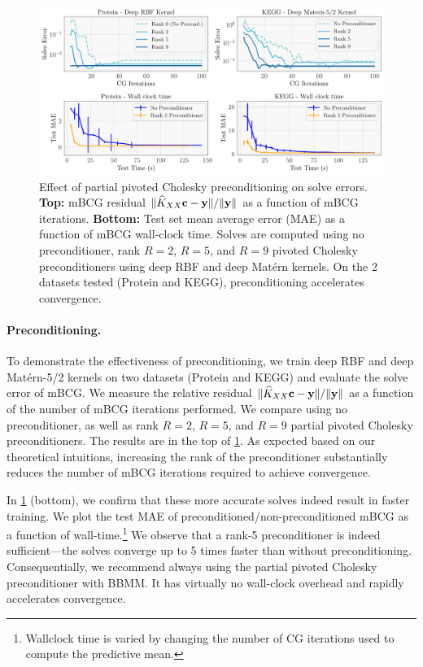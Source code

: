 \begin{figure}[t]
  \centering
  \includegraphics[width=\textwidth]{figures/precond_solves}
  \caption[Effect of partial pivoted Cholesky preconditioning on mBCG solve errors.]{
    Effect of partial pivoted Cholesky preconditioning on solve errors.
		{\bf Top:} mBCG residual $\Vert \widehat{K}_{XX} \mathbf{c} - \mathbf{y} \Vert / \Vert \mathbf{y} \Vert$ as a function of mBCG iterations.
    {\bf Bottom:} Test set mean average error (MAE) as a function of mBCG wall-clock time.
		Solves are computed using no preconditioner, rank $R=2$, $R=5$, and $R=9$ pivoted Cholesky preconditioners using deep RBF and deep Mat\'ern kernels.
		On the 2 datasets tested (Protein and KEGG), preconditioning accelerates convergence.
  }
  \label{fig:precond_results}
\end{figure}

\paragraph{Preconditioning.}
To demonstrate the effectiveness of preconditioning,
we train deep RBF and deep Mat\'ern-5/2 kernels on two datasets (Protein and KEGG) and evaluate the solve error of mBCG.
We measure the relative residual $\Vert \widehat{K}_{XX}\mathbf{c} - \mathbf{y} \Vert / \Vert \mathbf{y} \Vert$ as a function of the number of mBCG iterations performed.
We compare using no preconditioner, as well as rank $R=2$, $R=5$, and $R=9$ partial pivoted Cholesky preconditioners.
The results are in the top of \cref{fig:precond_results}.
As expected based on our theoretical intuitions, increasing the rank of the preconditioner substantially reduces the number of mBCG iterations required to achieve convergence.

In \cref{fig:precond_results} (bottom), we confirm that these more accurate solves indeed result in faster training.
We plot the test MAE of preconditioned/non-preconditioned mBCG as a function of wall-time.\footnote{
  Wallclock time is varied by changing the number of CG iterations used to compute the predictive mean.
}
We observe that a rank-5 preconditioner is indeed sufficient---the solves converge up to 5 times faster than without preconditioning.
Consequentially, we recommend always using the partial pivoted Cholesky preconditioner with BBMM.
It has virtually no wall-clock overhead and rapidly accelerates convergence.
